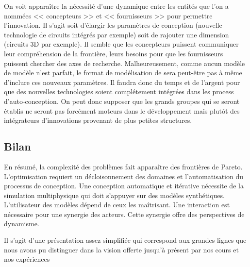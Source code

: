 \documentclass[11pt]{article}
\begin{document}
On voit apparaître la nécessité d'une dynamique entre les entités que l'on a 
nommées << concepteurs >> et << fournisseurs >> pour permettre l'innovation.
Il s'agit soit d'élargir les paramètres de conception (nouvelle technologie de 
circuits intégrés par exemple) soit de rajouter une dimension (circuits 3D par 
exemple). Il semble que les concepteurs puissent communiquer leur compréhension 
de la frontière, leurs besoins pour que les fournisseurs puissent chercher des 
axes de recherche. Malheureusement, comme aucun modèle de modèle n'est parfait, 
le format de modélisation de sera peut-être pas à même d'inclure ces nouveaux 
paramètres. Il faudra donc du temps et de l'argent pour que des nouvelles 
technologies soient complétement intégrées dans les process d'auto-conception. 
On peut donc supposer que les grands groupes qui se seront établis ne seront pas
forcément moteurs dans le développement mais plutôt des intégrateurs
d'innovations provenant de plus petites structures.

\subsection{Bilan}

En résumé, la complexité des problèmes fait apparaître des frontières de Pareto. 
L'optimisation requiert un décloisonnement des domaines et l'automatisation du 
processus de conception. Une conception automatique et itérative nécessite de la
simulation multiphysique qui doit s'appuyer sur des modèles synthétiques. 
L'utilisateur des modèles dépend de ceux les maîtrisant. Une interaction est 
nécessaire pour une synergie des acteurs. Cette synergie offre des perspectives 
de dynamisme.

Il s'agit d'une présentation assez simplifiée qui correspond aux grandes lignes 
que nous avons pu distinguer dans la vision offerte jusqu'à présent par nos 
cours et nos expériences
\end{document}
